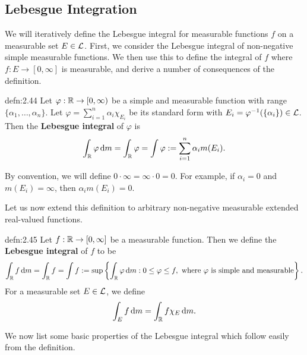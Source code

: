 \subsection{Lebesgue Integration} \label{subsec:2.6}
We will iteratively define the Lebesgue integral for measurable functions $f$
on a measurable set $E \in {\cal L}$. First, we consider the Lebesgue integral 
of non-negative simple measurable functions. We then use this to define 
the integral of $f$ where $f : E \to [0, \infty]$ is measurable, and 
derive a number of consequences of the definition. 

\begin{defn}{defn:2.44}
    Let $\varphi : \mathbb{R} \to [0, \infty)$ be a simple and measurable function
    with range $\{\alpha_1, \dots, \alpha_n\}$. Let $\varphi = \sum_{i=1}^n 
    \alpha_i \chi_{E_i}$ be its standard form with 
    $E_i = \varphi^{-1}(\{\alpha_i\}) \in {\cal L}$. Then the 
    {\bf Lebesgue integral} of $\varphi$ is 
    \[ \int_{\mathbb{R}} \varphi\,\mathrm{d} m = \int_{\mathbb{R}} \varphi = \int \varphi 
    := \sum_{i=1}^n \alpha_i m(E_i). \] 
\end{defn}

By convention, we will define $0 \cdot \infty = \infty \cdot 0 = 0$. For example, 
if $\alpha_i = 0$ and $m(E_i) = \infty$, then $\alpha_i m(E_i) = 0$. 

Let us now extend this definition to arbitrary non-negative measurable 
extended real-valued functions. 

\begin{defn}{defn:2.45}
    Let $f : \mathbb{R} \to [0, \infty]$ be a measurable function. Then we 
    define the {\bf Lebesgue integral} of $f$ to be 
    \[ \int_{\mathbb{R}} f\,\mathrm{d} m = \int_{\mathbb{R}} f = \int f 
    := \sup\left\{ \int_{\mathbb{R}} \varphi \,\mathrm{d} m : 0 \leq \varphi \leq f, 
    \text{ where $\varphi$ is simple and measurable} \right\}. \] 
    For a measurable set $E \in {\cal L}$, we define 
    \[ \int_E f\,\mathrm{d} m = \int_{\mathbb{R}} f\chi_E \,\mathrm{d} m. \] 
\end{defn}

We now list some basic properties of the Lebesgue integral which follow 
easily from the definition.

